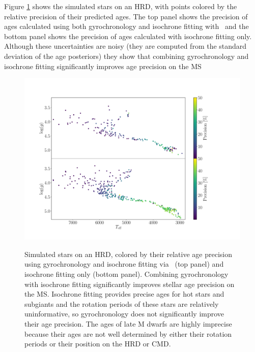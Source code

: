 Figure \ref{fig:precision} shows the simulated stars on an HRD, with
points colored by the relative precision of their predicted ages.
The top panel shows the precision of ages calculated using both gyrochronology
and isochrone fitting with \sd\ and the bottom panel shows the precision of
ages calculated with isochrone fitting only.
Although these uncertainties are noisy (they are computed from the standard
deviation of the age posteriors) they show that combining gyrochronology and
isochrone fitting significantly improves age precision on the MS
\begin{figure}
  \caption{
Simulated stars on an HRD, colored by their relative age precision
    using gyrochronology and isochrone fitting via \sd\ (top panel) and
    isochrone fitting only (bottom panel).
Combining gyrochronology with isochrone fitting significantly improves stellar
    age precision on the MS.
Isochrone fitting provides precise ages for hot stars and subgiants and the
    rotation periods of these stars are relatively uninformative, so
    gyrochronology does not significantly improve their age precision.
The ages of late M dwarfs are highly imprecise because their ages are not well
    determined by either their rotation periods or their position on the HRD
    or CMD.
}
  \centering
    \includegraphics[width=1\textwidth]{precision_plot}
\label{fig:precision}
\end{figure}

